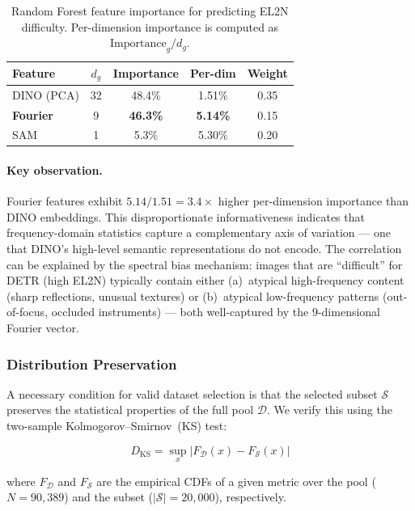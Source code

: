 \begin{table}[h]
\centering
\caption{Random Forest feature importance for predicting EL2N difficulty.
         Per-dimension importance is computed as
         $\text{Importance}_g / d_g$.}
\label{tab:rf_importance}
\begin{tabular}{lcccc}
\toprule
\textbf{Feature} & $d_g$ & \textbf{Importance} &
    \textbf{Per-dim} & \textbf{Weight} \\
\midrule
DINO (PCA)       & 32 & 48.4\% & 1.51\% & 0.35 \\
\textbf{Fourier} &  9 & \textbf{46.3\%} & \textbf{5.14\%} & 0.15 \\
SAM              &  1 &  5.3\% & 5.30\% & 0.20 \\
\bottomrule
\end{tabular}
\end{table}

\paragraph{Key observation.}
Fourier features exhibit $5.14 / 1.51 = 3.4\times$ higher per-dimension
importance than DINO embeddings.  This disproportionate informativeness
indicates that frequency-domain statistics capture a complementary axis of
variation --- one that DINO's high-level semantic representations do not
encode.  The correlation can be explained by the spectral bias mechanism:
images that are ``difficult'' for DETR (high EL2N) typically contain either
(a)~atypical high-frequency content (sharp reflections, unusual textures) or
(b)~atypical low-frequency patterns (out-of-focus, occluded instruments)
--- both well-captured by the 9-dimensional Fourier vector.

\subsubsection{Distribution Preservation}

A necessary condition for valid dataset selection is that the selected subset
$\mathcal{S}$ preserves the statistical properties of the full pool
$\mathcal{D}$.  We verify this using the two-sample
Kolmogorov--Smirnov~(KS) test:

\begin{equation}
    D_{\text{KS}} = \sup_x \bigl|F_{\mathcal{D}}(x) - F_{\mathcal{S}}(x)\bigr|
\end{equation}

where $F_{\mathcal{D}}$ and $F_{\mathcal{S}}$ are the empirical CDFs of a
given metric over the pool ($N = 90{,}389$) and the subset
($|\mathcal{S}| = 20{,}000$), respectively.

